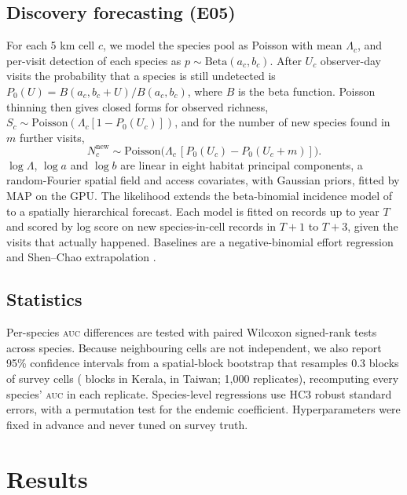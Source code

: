 \documentclass[11pt]{article}
\newcommand{\auc}{\textsc{auc}}
\begin{document}
\subsection{Discovery forecasting (E05)}
For each 5 km cell $c$, we model the species pool as Poisson with mean $\Lambda_c$, and per-visit detection of each species as $p\sim\text{Beta}(a_c,b_c)$. After $U_c$ observer-day visits the probability that a species is still undetected is $P_0(U)=B(a_c,b_c+U)/B(a_c,b_c)$, where $B$ is the beta function. Poisson thinning then gives closed forms for observed richness, $S_c\sim\text{Poisson}(\Lambda_c[1-P_0(U_c)])$, and for the number of new species found in $m$ further visits,
\begin{equation}
N^{\text{new}}_c \sim \text{Poisson}\bigl(\Lambda_c\,[P_0(U_c)-P_0(U_c+m)]\bigr).
\end{equation}
$\log\Lambda$, $\log a$ and $\log b$ are linear in eight habitat principal components, a random-Fourier spatial field and access covariates, with Gaussian priors, fitted by MAP on the GPU. The likelihood extends the beta-binomial incidence model of \citet{chiu2022} to a spatially hierarchical forecast. Each model is fitted on records up to year $T$ and scored by log score on new species-in-cell records in $T+1$ to $T+3$, given the visits that actually happened. Baselines are a negative-binomial effort regression and Shen--Chao extrapolation \citep{shen2003}.

\subsection{Statistics}
Per-species \auc{} differences are tested with paired Wilcoxon signed-rank tests across species. Because neighbouring cells are not independent, we also report 95\% confidence intervals from a spatial-block bootstrap that resamples 0.3\textdegree{} blocks of survey cells (\Kblocks{} blocks in Kerala, \Tblocks{} in Taiwan; 1,000 replicates), recomputing every species' \auc{} in each replicate. Species-level regressions use HC3 robust standard errors, with a permutation test for the endemic coefficient. Hyperparameters were fixed in advance and never tuned on survey truth.

\section{Results}
\end{document}
